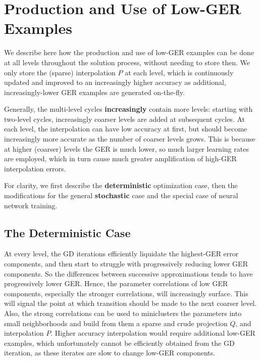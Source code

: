 \documentclass{article} %
\begin{document}

\section{Production and Use of Low-GER Examples}
\label{sec:low_ger}

We describe here how the production and use of low-GER examples can be done at all levels throughout the solution process, without needing to store then. We only store the (sparse) interpolation $P$ at each level, which is continuously updated and improved to an increasingly higher accuracy as additional, increasingly-lower GER examples are generated on-the-fly.

Generally, the multi-level cycles \textbf{increasingly} contain more levels: starting with two-level cycles, increasingly coarser levels are added at subsequent cycles. At each level, the interpolation can have low accuracy at first, but should become increasingly more accurate as the number of coarser levels grows. This is because at higher (coarser) levels the GER is much lower, so much larger learning rates are employed, which in turn cause much greater amplification of high-GER interpolation errors.

For clarity, we first describe the \textbf{deterministic} optimization case, then the modifications for the general \textbf{stochastic} case and the special case of neural network training.

\subsection{The Deterministic Case}
At every level, the GD iterations efficiently liquidate the highest-GER error components, and then start to struggle with progressively reducing lower GER components. So the differences between successive approximations tends to have progressively lower GER. Hence, the parameter correlations of low GER components, especially the stronger correlations, will increasingly surface. This will signal the point at which transition should be made to the next coarser level. Also, the strong correlations can be used to miniclusters the parameters into small neighborhoods and build from them a sparse and crude projection $Q$, and interpolation $P$. Higher accuracy interpolation would require additional low-GER examples, which unfortunately cannot be efficiently obtained from the GD iteration, as these iterates are slow to change low-GER components.
\end{document}

